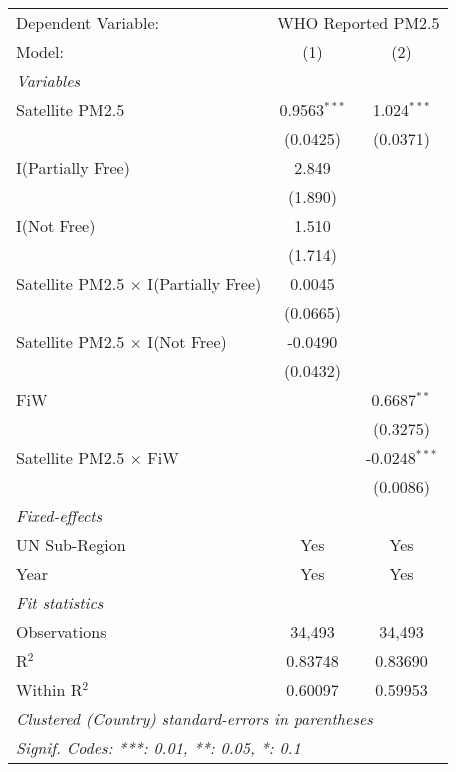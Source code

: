 
\begingroup
\centering
\begin{tabular}{lcc}
   \tabularnewline \midrule \midrule
   Dependent Variable: & \multicolumn{2}{c}{WHO Reported PM2.5}\\
   Model:                                      & (1)            & (2)\\  
   \midrule
   \emph{Variables}\\
   Satellite PM2.5                             & 0.9563$^{***}$ & 1.024$^{***}$\\   
                                               & (0.0425)       & (0.0371)\\   
   I(Partially Free)                           & 2.849          &   \\   
                                               & (1.890)        &   \\   
   I(Not Free)                                 & 1.510          &   \\   
                                               & (1.714)        &   \\   
   Satellite PM2.5 $\times$ I(Partially Free)  & 0.0045         &   \\   
                                               & (0.0665)       &   \\   
   Satellite PM2.5 $\times$ I(Not Free)        & -0.0490        &   \\   
                                               & (0.0432)       &   \\   
   FiW                                         &                & 0.6687$^{**}$\\   
                                               &                & (0.3275)\\   
   Satellite PM2.5 $\times$ FiW                &                & -0.0248$^{***}$\\   
                                               &                & (0.0086)\\   
   \midrule
   \emph{Fixed-effects}\\
   UN Sub-Region                               & Yes            & Yes\\  
   Year                                        & Yes            & Yes\\  
   \midrule
   \emph{Fit statistics}\\
   Observations                                & 34,493         & 34,493\\  
   R$^2$                                       & 0.83748        & 0.83690\\  
   Within R$^2$                                & 0.60097        & 0.59953\\  
   \midrule \midrule
   \multicolumn{3}{l}{\emph{Clustered (Country) standard-errors in parentheses}}\\
   \multicolumn{3}{l}{\emph{Signif. Codes: ***: 0.01, **: 0.05, *: 0.1}}\\
\end{tabular}
\par\endgroup


